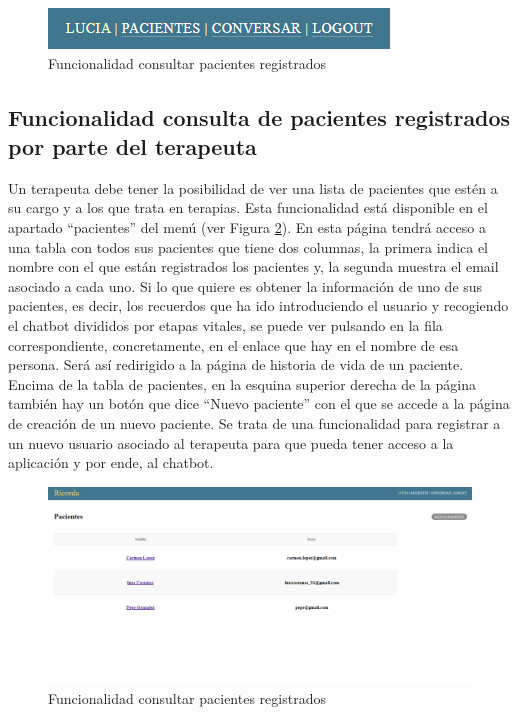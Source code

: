 \begin{figure}[h]
	\centering
	\includegraphics[scale=1.0]{Imagenes/Vectorial/funcionalidad_terapeutavspaciente}
	\caption{Funcionalidad consultar pacientes registrados}
	\label{fig:funcionalidadterapeutavspacientes}
\end{figure}

\subsection{Funcionalidad consulta de pacientes registrados por parte del terapeuta}

Un terapeuta debe tener la posibilidad de ver una lista de pacientes que estén a su cargo y a los que trata en terapias. Esta funcionalidad está disponible en el apartado ``pacientes'' del menú (ver Figura \ref{fig:funcionalidadconsultadepacientes}). En esta página tendrá acceso a una tabla con todos sus pacientes que tiene dos columnas, la primera indica el nombre con el que están registrados los pacientes y, la segunda muestra el email asociado a cada uno. Si lo que quiere es obtener la información de uno de sus pacientes, es decir, los recuerdos que ha ido introduciendo el usuario y recogiendo el chatbot divididos por etapas vitales, se puede ver pulsando en la fila correspondiente, concretamente, en el enlace que hay en el nombre de esa persona. Será así redirigido a la página de historia de vida de un paciente. Encima de la tabla de pacientes, en la esquina superior derecha de la página también hay un botón que dice ``Nuevo paciente'' con el que se accede a la página de creación de un nuevo paciente. Se trata de una funcionalidad para registrar a un nuevo usuario asociado al terapeuta para que pueda tener acceso a la aplicación y por ende, al chatbot.

\begin{figure}[h]
	\centering
	\includegraphics[scale=0.3]{Imagenes/Vectorial/funcionalidad_consultar_pacientes}
	\caption{Funcionalidad consultar pacientes registrados}
	\label{fig:funcionalidadconsultadepacientes}
\end{figure}

